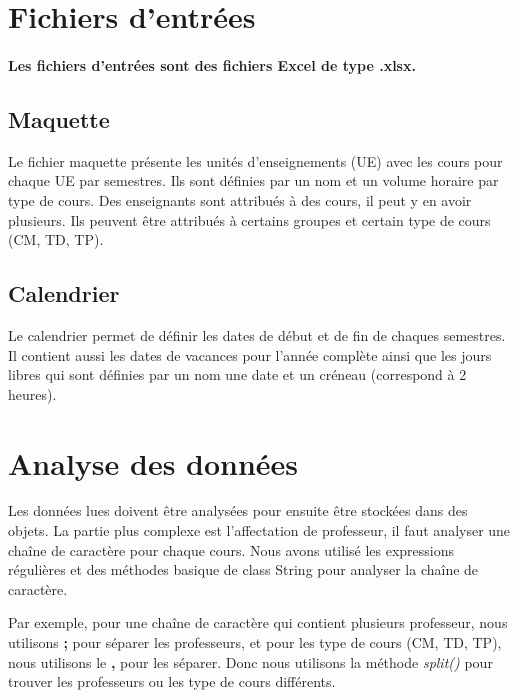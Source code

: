 \documentclass{polytech/polytech}
\begin{document}
	\section{Fichiers d'entrées}

	\paragraph{Les fichiers d'entrées sont des fichiers Excel de type .xlsx.}

	\subsection{Maquette}

	Le fichier maquette présente les unités d'enseignements (UE) avec les cours pour chaque UE par semestres.
	Ils sont définies par un nom et un volume horaire par type de cours.
	Des enseignants sont attribués à des cours, il peut y en avoir plusieurs.
	Ils peuvent être attribués à certains groupes et certain type de cours (CM, TD, TP).

	\subsection{Calendrier}

	Le calendrier permet de définir les dates de début et de fin de chaques semestres.
	Il contient aussi les dates de vacances pour l'année complète ainsi que les jours libres qui sont définies par un nom une date et un créneau (correspond à 2 heures).

	\section{Analyse des données}
	\label{format}
	Les données lues doivent être analysées pour ensuite être stockées dans des objets.
	La partie plus complexe est l'affectation de professeur, il faut analyser une chaîne de caractère pour chaque cours.
	Nous avons utilisé les expressions régulières et des méthodes basique de class String pour analyser la chaîne de caractère.

	Par exemple, pour une chaîne de caractère qui contient plusieurs professeur, nous utilisons \textbf{;} pour séparer les professeurs,
	et pour les type de cours (CM, TD, TP), nous utilisons le \textbf{,} pour les séparer.
	Donc nous utilisons la méthode \textit{split()} pour trouver les professeurs ou les type de cours différents.
\end{document}
